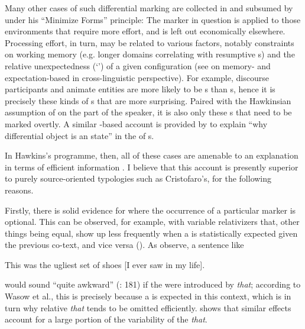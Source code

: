\documentclass[output=paper]{langsci/langscibook}
\begin{document}
Many other cases of such differential marking are collected in \citet{Haspelmath2008_Econ} and subsumed by \citet{Hawkins2004_Eff,Hawkins2014_VarEff} under his “Minimize Forms” principle: The marker in question is applied to those environments that require more  effort, and is left out economically elsewhere. Processing effort, in turn, may be related to various factors, notably constraints on working memory (e.g. longer  domains correlating with resumptive s) and the relative unexpectedness (‘’) of a given configuration (see \citealt{NorcliffeEtAl2015} on memory- and expectation-based  in cross-linguistic perspective). For example, discourse participants and animate entities are more likely to be s than s, hence it is precisely these kinds of s that are more surprising. Paired with the Hawkinsian assumption of  on the part of the speaker, it is also only these s that need to be marked overtly. A similar -based account is provided by \citet{Haig2018_DOI} to explain “why differential object  is an  state” \citep[781]{Haig2018_DOI} in the  of  s.

In Hawkins’s programme, then, all of these cases are amenable to an explanation in terms of efficient information . I believe that this account is presently superior to purely source-oriented typologies such as Cristofaro’s, for the following reasons.

Firstly, there is solid evidence for  where the occurrence of a particular marker is optional. This can be observed, for example, with variable relativizers that, other things being equal, show up less frequently when a  is statistically expected given the previous co-text, and vice versa (\citealt{WasowEtAl2011}). As \citet{FoxThompson2007} observe, a sentence like

\ea
{{This was the ugliest set of shoes} [{I ever saw in my life}].} \\
\z

\noindent would sound “quite awkward” (\citealt{WasowEtAl2011}: 181) if the  were introduced by \textit{that}; according to Wasow et al., this is precisely because a  is expected in this context, which is in turn why relative \textit{that} tends to be omitted efficiently. \citet{Jaeger2010_Red} shows that similar  effects account for a large portion of the variability of the   \textit{that}. 
\end{document}
